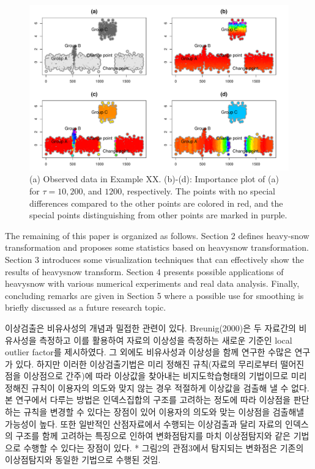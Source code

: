 \documentclass[preprint, review, 12pt]{article}
\theoremstyle{definition}
\theoremstyle{remark}
\begin{document}
\begin{figure}
\centering
\includegraphics[width=1\textwidth]{Fig/Fig3.pdf}
\caption{(a) Observed data in Example XX. (b)-(d): Importance plot of (a) for $\tau=10, 200$, and $1200$, respectively. The points with no special differences compared to the other points are colored in red, and the special points distinguishing from other points are marked in purple.}
\end{figure}

The remaining of this paper is organized as follows. Section 2 defines heavy-snow transformation and proposes some statistics based on heavysnow transformation. 
Section 3 introduces some visualization techniques that can effectively show the results of heavysnow transform. Section 4 presents possible applications of heavysnow with various numerical experiments and real data analysis. Finally, concluding remarks are given in Section 5 where a possible use for smoothing is briefly discussed as a future research topic. 

\iffalse

이상검출은 비유사성의 개념과 밀접한 관련이 있다. Breunig(2000)은 두 자료간의 비유사성을 측정하고 이를 활용하여 자료의 이상성을 측정하는 새로운 기준인 local outlier factor를 제시하였다. 그 외에도 비유사성과 이상성을 함께 연구한 수많은 연구가 있다. 하지만 이러한 이상검출기법은 미리 정해진 규칙(자료의 무리로부터 떨어진 점을 이상점으로 간주)에 따라 이상값을 찾아내는 비지도학습형태의 기법이므로 미리 정해진 규칙이 이용자의 의도와 맞지 않는 경우 적절하게 이상값을 검출해 낼 수 없다. 본 연구에서 다루는 방법은 인덱스집합의 구조를 고려하는 정도에 따라 이상점을 판단하는 규칙을 변경할 수 있다는 장점이 있어 이용자의 의도와 맞는 이상점을 검출해낼 가능성이 높다. 또한 일반적인 산점자료에서 수행되는 이상검출과 달리 자료의 인덱스의 구조를 함께 고려하는 특징으로 인하여 변화점탐지를 마치 이상점탐지와 같은 기법으로 수행할 수 있다는 장점이 있다.  
* 그림2의 관점3에서 탐지되는 변화점은 기존의 이상점탐지와 동일한 기법으로 수행된 것임.
\end{document}
